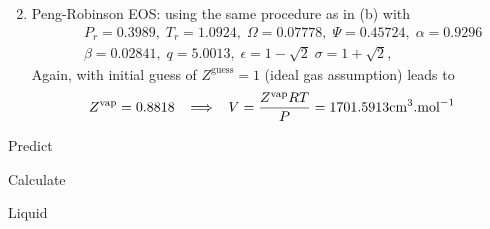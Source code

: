 \begin{probsol}
\begin{enumerate}[1.]
\begin{displaymath}
                   \end{displaymath}
%
        \item Peng-Robinson EOS: using the same procedure as in (b) with 
                   \begin{eqnarray}
                      && P_{r} = 0.3989,\; T_{r}=1.0924,\; \Omega=0.07778,\; \Psi = 0.45724,\; \alpha=0.9296 \nonumber  \\
                      && \beta = 0.02841,\; q=5.0013,\; \epsilon = 1 - \sqrt{2}\; \sigma = 1 + \sqrt{2}, \nonumber 
                   \end{eqnarray}
                   Again, with initial guess of $Z^{\text{guess}}=1$ (ideal gas assumption) leads to 
                   \begin{displaymath}
                      Z^{\text{vap}} = 0.8818 \;\;\;\Longrightarrow \;\;\; V = \displaystyle\frac{Z^{\text{vap}} R T}{P} = 1701.5913 \text{cm}^{3}\text{.mol}^{-1}
                   \end{displaymath}
%
     \end{enumerate}


  \end{probsol}
%
  \begin{probsol}\label{Chapter:VolumetricPropertiesPureSubstances:Problem:02:solution}
     Predict 
  \end{probsol}
%
  \begin{probsol}\label{Chapter:VolumetricPropertiesPureSubstances:Problem:03:solution}
     Calculate
  \end{probsol}
%
  \begin{probsol}\label{Chapter:VolumetricPropertiesPureSubstances:Problem:04:solution} 
     Liquid 
  \end{probsol}
%
